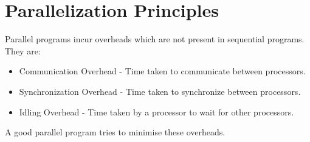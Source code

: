 \documentclass[12pt]{article}
\begin{document}
\newpage

\section{Parallelization Principles}
Parallel programs incur overheads which are not present in sequential programs. They are:
\begin{itemize}
    \item Communication Overhead - Time taken to communicate between processors.
    \item Synchronization Overhead - Time taken to synchronize between processors.
    \item Idling Overhead - Time taken by a processor to wait for other processors.
\end{itemize}
A good parallel program tries to minimise these overheads.
\end{document}
